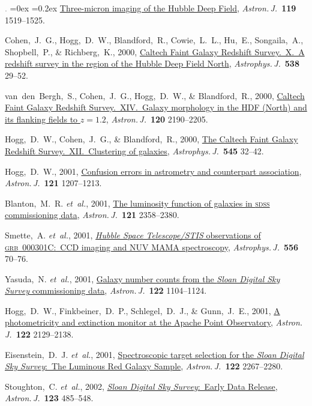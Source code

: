 \documentclass[12pt,letterpaper]{article}
\newcommand{\latin}[1]{\textsl{#1}}
\newcommand{\etal}{\latin{et~al.}}
\newcommand{\satellite}[1]{\textsl{#1}}
\newcommand{\project}[1]{\textsl{#1}}
\newcommand{\doi}[2]{\href{http://dx.doi.org/#1}{{#2}}}
\newcommand{\deemph}[1]{\textcolor{grey}{\footnotesize{#1}}}
\newcommand{\pubnumber}[1]{\deemph{{#1}.}}
\newcounter{refpubnum}
\newcommand{\hogglist}{%
    \rightmargin=0in
    \leftmargin=0.18in
    \topsep=0ex
    \partopsep=0pt
    \itemsep=0.2ex
    \parsep=0pt
    \itemindent=-1.0\leftmargin
    \listparindent=0.0\leftmargin
    \settowidth{\labelsep}{~}
    \usecounter{refpubnum}
  }
\begin{document}
\begin{list}{\pubnumber{\therefpubnum}}{\hogglist}
\doi{10.1086/301309}{Three-micron imaging of the Hubble Deep Field},
\textit{Astron.\,J.}\ \textbf{119} 1519--1525.
\item\label{pub:Cohen2000}
Cohen,~J.~G., Hogg,~D.~W., Blandford,~R., Cowie,~L.~L., Hu,~E., Songaila,~A., Shopbell,~P., \& Richberg,~K., 2000,
\doi{10.1086/309096}{Caltech Faint Galaxy Redshift Survey.\ X.\ A redshift survey in the region of the Hubble Deep Field North},
\textit{Astrophys.\,J.}\ \textbf{538} 29--52.
\item
van~den~Bergh,~S., Cohen,~J.~G., Hogg,~D.~W., \& Blandford,~R., 2000,
\doi{10.1086/316828}{Caltech Faint Galaxy Redshift Survey.\ XIV.\ Galaxy morphology in the HDF (North) and its flanking fields to $z=1.2$},
\textit{Astron.\,J.}\ \textbf{120} 2190--2205.
\item
Hogg,~D.~W., Cohen,~J.~G., \& Blandford,~R., 2000,
\doi{10.1086/317779}{The Caltech Faint Galaxy Redshift Survey.\ XII.\ Clustering of galaxies},
\textit{Astrophys.\,J.}\ \textbf{545} 32--42.
\item
Hogg,~D.~W., 2001,
\doi{10.1086/318736}{Confusion errors in astrometry and counterpart association},
\textit{Astron.\,J.}\ \textbf{121} 1207--1213.
\item
Blanton,~M.~R. \etal, 2001,
\doi{10.1086/320405}{The luminosity function of galaxies in \textsc{sdss} commissioning data},
\textit{Astron.\,J.}\ \textbf{121} 2358--2380.
\item
Smette,~A. \etal, 2001,
\doi{10.1086/321585}{\satellite{Hubble Space Telescope/STIS} observations of \textsc{grb}~000301C:\ CCD imaging and NUV MAMA spectroscopy},
\textit{Astrophys.\,J.}\ \textbf{556} 70--76.
\item
Yasuda,~N. \etal, 2001,
\doi{10.1086/322093}{Galaxy number counts from the \project{Sloan Digital Sky Survey} commissioning data},
\textit{Astron.\,J.}\ \textbf{122} 1104--1124.
\item\label{pub:Hogg2001}
Hogg,~D.~W., Finkbeiner,~D.~P., Schlegel,~D.~J., \& Gunn,~J.~E., 2001,
\doi{10.1086/323103}{A photometricity and extinction monitor at the Apache Point Observatory},
\textit{Astron.\,J.}\ \textbf{122} 2129--2138.
\item
Eisenstein,~D.~J. \etal, 2001,
\doi{10.1086/323717}{Spectroscopic target selection for the \project{Sloan Digital Sky Survey}:\ The Luminous Red Galaxy Sample},
\textit{Astron.\,J.}\ \textbf{122} 2267--2280.
\item
Stoughton,~C. \etal, 2002,
\doi{10.1086/324741}{\project{Sloan Digital Sky Survey}:\ Early Data Release},
\textit{Astron.\,J.}\ \textbf{123} 485--548.

\end{list}
\end{document}
